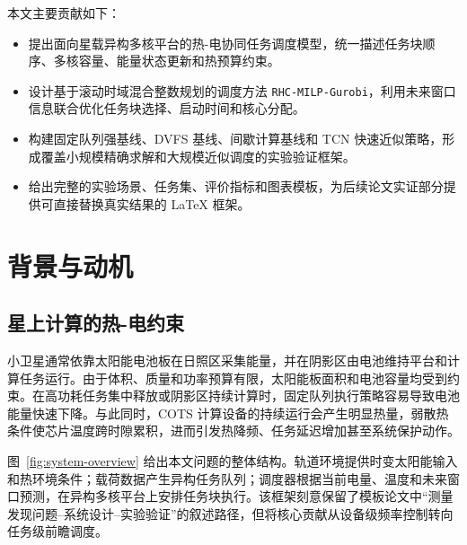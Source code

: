 \documentclass[conference]{IEEEtran}
\newcommand{\rhc}{\texttt{RHC-MILP-Gurobi}}
\begin{document}
本文主要贡献如下：
\begin{itemize}
  \item 提出面向星载异构多核平台的热-电协同任务调度模型，统一描述任务块顺序、多核容量、能量状态更新和热预算约束。
  \item 设计基于滚动时域混合整数规划的调度方法 \rhc，利用未来窗口信息联合优化任务块选择、启动时间和核心分配。
  \item 构建固定队列强基线、DVFS 基线、间歇计算基线和 TCN 快速近似策略，形成覆盖小规模精确求解和大规模近似调度的实验验证框架。
  \item 给出完整的实验场景、任务集、评价指标和图表模板，为后续论文实证部分提供可直接替换真实结果的 LaTeX 框架。
\end{itemize}

\section{背景与动机}

\subsection{星上计算的热-电约束}

小卫星通常依靠太阳能电池板在日照区采集能量，并在阴影区由电池维持平台和计算任务运行。由于体积、质量和功率预算有限，太阳能板面积和电池容量均受到约束。在高功耗任务集中释放或阴影区持续计算时，固定队列执行策略容易导致电池能量快速下降。与此同时，COTS 计算设备的持续运行会产生明显热量，弱散热条件使芯片温度跨时隙累积，进而引发热降频、任务延迟增加甚至系统保护动作。

图~\ref{fig:system-overview} 给出本文问题的整体结构。轨道环境提供时变太阳能输入和热环境条件；载荷数据产生异构任务队列；调度器根据当前电量、温度和未来窗口预测，在异构多核平台上安排任务块执行。该框架刻意保留了模板论文中“测量发现问题--系统设计--实验验证”的叙述路径，但将核心贡献从设备级频率控制转向任务级前瞻调度。
\end{document}
